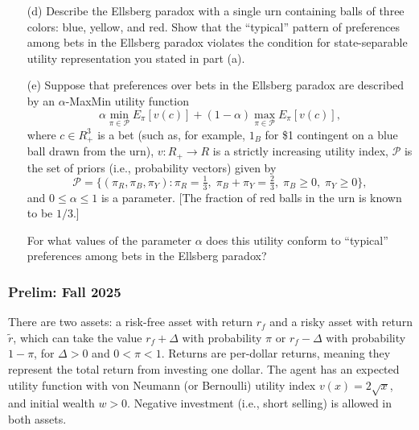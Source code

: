 \documentclass[11pt,english]{article}
\begin{document}
\begin{enumerate}
    \item[(d)] Describe the Ellsberg paradox with a single urn containing balls
        of three colors: blue, yellow, and red. Show that the ``typical''
        pattern of preferences among bets in the Ellsberg paradox violates the
        condition for state-separable utility representation you stated in part
        (a).
    \begin{solution}
 
    \end{solution}
 
    \item[(e)] Suppose that preferences over bets in the Ellsberg paradox are
        described by an $\alpha$-MaxMin utility function
        \[
            \alpha \min_{\pi \in \mathcal{P}} E_\pi[v(c)]
            + (1-\alpha) \max_{\pi \in \mathcal{P}} E_\pi[v(c)],
        \]
        where $c \in R_+^3$ is a bet (such as, for example, $1_B$ for \$1
        contingent on a blue ball drawn from the urn), $v : R_+ \to R$ is a
        strictly increasing utility index, $\mathcal{P}$ is the set of priors
        (i.e., probability vectors) given by
        \[
            \mathcal{P} = \bigl\{(\pi_R, \pi_B, \pi_Y) :
            \pi_R = \tfrac{1}{3},\;
            \pi_B + \pi_Y = \tfrac{2}{3},\;
            \pi_B \geq 0,\; \pi_Y \geq 0\bigr\},
        \]
        and $0 \leq \alpha \leq 1$ is a parameter. [The fraction of red balls
        in the urn is known to be $1/3$.]
 
        For what values of the parameter $\alpha$ does this utility conform to
        ``typical'' preferences among bets in the Ellsberg paradox?
    \begin{solution}
 
    \end{solution}
\end{enumerate}


\subsubsection{Prelim: Fall 2025}\label{Werner Prelim: Fall 2025}
There are two assets: a risk-free asset with return $r_f$ and a risky asset
with return $\tilde{r}$, which can take the value $r_f + \Delta$ with
probability $\pi$ or $r_f - \Delta$ with probability $1 - \pi$, for $\Delta >
0$ and $0 < \pi < 1$. Returns are per-dollar returns, meaning they represent
the total return from investing one dollar. The agent has an expected utility
function with von Neumann (or Bernoulli) utility index $v(x) = 2\sqrt{x}$, and
initial wealth $w > 0$. Negative investment (i.e., short selling) is allowed
in both assets.
 
\end{document}
